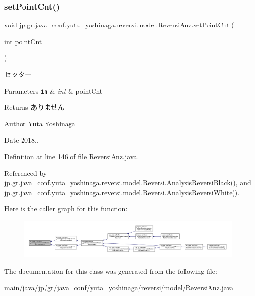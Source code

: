 \subsubsection{\texorpdfstring{set\+Point\+Cnt()}{setPointCnt()}}
{\footnotesize\ttfamily void jp.\+gr.\+java\+\_\+conf.\+yuta\+\_\+yoshinaga.\+reversi.\+model.\+Reversi\+Anz.\+set\+Point\+Cnt (\begin{DoxyParamCaption}\item[{int}]{point\+Cnt }\end{DoxyParamCaption})}



セッター 


\begin{DoxyParams}[1]{Parameters}
\mbox{\tt in}  & {\em int} & point\+Cnt \\
\hline
\end{DoxyParams}
\begin{DoxyReturn}{Returns}
ありません 
\end{DoxyReturn}
\begin{DoxyAuthor}{Author}
Yuta Yoshinaga 
\end{DoxyAuthor}
\begin{DoxyDate}{Date}
2018.. 
\end{DoxyDate}


Definition at line 146 of file Reversi\+Anz.\+java.



Referenced by jp.\+gr.\+java\+\_\+conf.\+yuta\+\_\+yoshinaga.\+reversi.\+model.\+Reversi.\+Analysis\+Reversi\+Black(), and jp.\+gr.\+java\+\_\+conf.\+yuta\+\_\+yoshinaga.\+reversi.\+model.\+Reversi.\+Analysis\+Reversi\+White().

Here is the caller graph for this function\+:
\nopagebreak
\begin{figure}[H]
\begin{center}
\leavevmode
\includegraphics[width=350pt]{classjp_1_1gr_1_1java__conf_1_1yuta__yoshinaga_1_1reversi_1_1model_1_1_reversi_anz_ad57c26b0d7851a3c9e1b1ad328f2f0be_icgraph}
\end{center}
\end{figure}


The documentation for this class was generated from the following file\+:\begin{DoxyCompactItemize}
\item 
main/java/jp/gr/java\+\_\+conf/yuta\+\_\+yoshinaga/reversi/model/\hyperlink{_reversi_anz_8java}{Reversi\+Anz.\+java}\end{DoxyCompactItemize}
